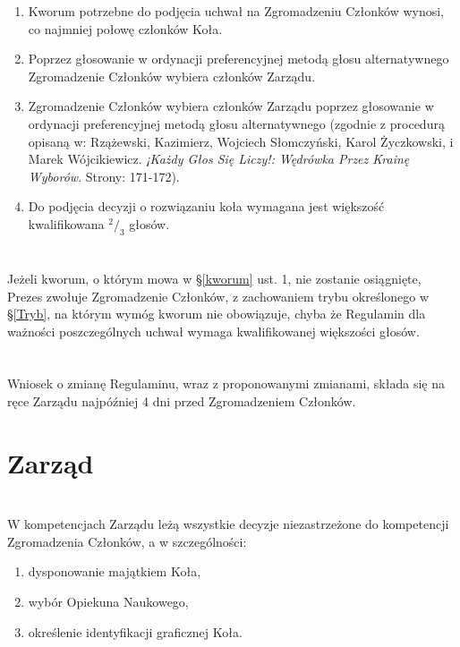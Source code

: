 \documentclass[a4paper]{article}
\begin{document}
\begin{enumerate}
\label{kworum}
\item Kworum potrzebne do podjęcia uchwał na Zgromadzeniu Członków wynosi, co najmniej połowę członków Koła.
\item Poprzez głosowanie w ordynacji preferencyjnej metodą głosu alternatywnego Zgromadzenie Członków wybiera członków Zarządu.
\item Zgromadzenie Członków wybiera członków Zarządu poprzez głosowanie w ordynacji preferencyjnej metodą głosu alternatywnego (zgodnie z procedurą opisaną w: Rzążewski, Kazimierz, Wojciech Słomczyński, Karol Życzkowski, i Marek Wójcikiewicz. \textit{¡Każdy Głos Się Liczy!: Wędrówka Przez Krainę Wyborów}. Strony: 171-172).
\item Do podjęcia decyzji o rozwiązaniu koła wymagana jest większość kwalifikowana $^2/_3$ głosów.
\end{enumerate}

\section{}
Jeżeli kworum, o którym mowa w \S \ref{kworum} ust. 1, nie zostanie osiągnięte, Prezes zwołuje Zgromadzenie Członków, z zachowaniem trybu określonego w \S \ref{Tryb}, na którym wymóg kworum nie obowiązuje, chyba że Regulamin dla ważności poszczególnych uchwał wymaga kwalifikowanej większości głosów. 

\section{}
Wniosek o zmianę Regulaminu, wraz z proponowanymi zmianami, składa się na ręce Zarządu najpóźniej 4 dni przed Zgromadzeniem Członków.

\section*{Zarząd~~~}
\section{}
W kompetencjach Zarządu leżą wszystkie decyzje niezastrzeżone do kompetencji Zgromadzenia Członków, a w szczególności:
\begin{enumerate}[label=\alph*)]
\item dysponowanie majątkiem Koła,
\item wybór Opiekuna Naukowego,
\item określenie identyfikacji graficznej Koła.
\end{enumerate}
\end{document}
